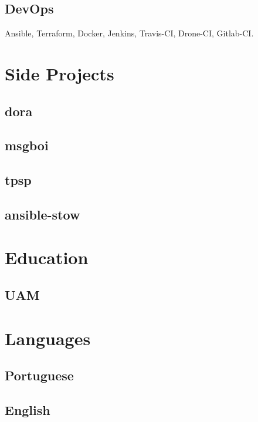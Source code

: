 \documentclass{article}
\begin{document}
        \subsection{DevOps}
        Ansible, Terraform, Docker, Jenkins, Travis-CI, Drone-CI, Gitlab-CI.

    \section{Side Projects}

        \subsection{dora}
        \subsection{msgboi}
        \subsection{tpsp}
        \subsection{ansible-stow}

    \section{Education}

        \subsection{UAM}

    \section{Languages}

        \subsection{Portuguese}
        \subsection{English}
\end{document}
